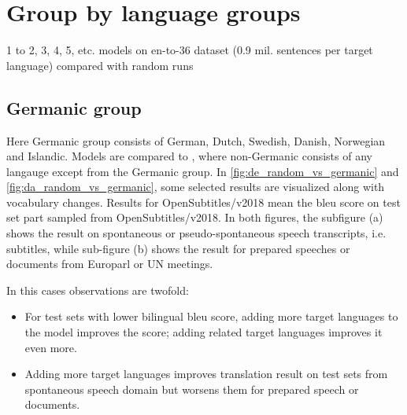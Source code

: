 \chapter{Group by language groups}

1 to 2, 3, 4, 5, etc. models on en-to-36 dataset (0.9 mil. sentences per target language)
compared with random runs


\section{Germanic group}
\label{section:germanic_group}

Here Germanic group consists of German, Dutch, Swedish, Danish, Norwegian and Islandic.
Models  are compared to , where non-Germanic consists
of any langauge except from the Germanic group.
In \cref{fig:de_random_vs_germanic} and \cref{fig:da_random_vs_germanic}, some selected
results are visualized along with vocabulary changes. Results for OpenSubtitles/v2018 mean
the \acrshort{bleu} score on test set part sampled from OpenSubtitles/v2018.
In both figures, the subfigure (a) shows the result on spontaneous or pseudo-spontaneous speech
transcripts, i.e. subtitles, while sub-figure (b) shows the result for prepared
speeches or documents from Europarl or UN meetings.

In this cases observations are twofold:
\begin{itemize}
	\item For test sets with lower bilingual \acrshort{bleu} score,
		adding more target languages to the model improves the score;
		adding related target languages improves it even more.
	\item Adding more target languages improves translation result on test
		sets from spontaneous speech domain
		but worsens them for prepared speech or documents.
\end{itemize}



